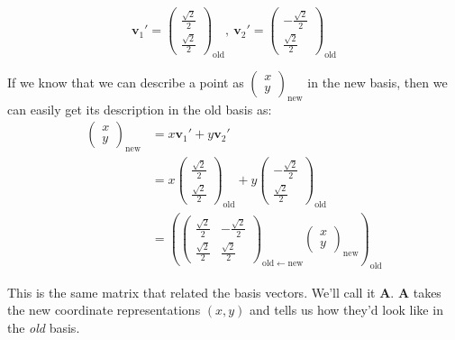 \documentclass[../master.tex]{subfiles}
\begin{document}
	\begin{equation*}
		\mathbf v_1' = \begin{pmatrix}
			\frac{\sqrt 2}{2} \\ \frac{\sqrt 2}{2}
		\end{pmatrix}_{\mathrm{old}}, ~
		\mathbf v_2' = \begin{pmatrix}
			-\frac{\sqrt 2}{2} \\ \frac{\sqrt 2}{2}
		\end{pmatrix}_{\mathrm{old}}
	\end{equation*}
		
	If we know that we can describe a point as $\begin{pmatrix}
					x \\ y
		\end{pmatrix}_{\text{new}}$
	in the new basis, then we can easily get its description in the old basis as:
	\begin{equation}\label{eq:ContravariantTransform}
		\begin{aligned}
			\begin{pmatrix}
						x \\ y
			\end{pmatrix}_{\mathrm{new}} 
			&= x \mathbf v_1' + y \mathbf v_2' \\
			&= x \begin{pmatrix}
				\frac{\sqrt 2}{2} \\ \frac{\sqrt 2}{2}
			\end{pmatrix}_{\mathrm{old}} 
			+ y \begin{pmatrix}
				-\frac{\sqrt 2}{2} \\ \frac{\sqrt 2}{2}
			\end{pmatrix}_{\mathrm{old}}
			\\ &=\left( \begin{pmatrix}
				 \frac{\sqrt 2}{2} &  -\frac{\sqrt 2}{2} \\
				 \frac{\sqrt 2}{2} &  \frac{\sqrt 2}{2}
			\end{pmatrix}_{\mathrm{old} \leftarrow \mathrm{new}}
			\begin{pmatrix}
						x \\ y
			\end{pmatrix}_{\mathrm{new}} \right)_{\mathrm{old}} 
		\end{aligned}
	\end{equation}
	
	This is the same matrix that related the basis vectors. We'll call it $\mathbf A$. $\mathbf A$ takes the new coordinate representations $(x,y)$ and tells us how they'd look like in the \emph{old} basis. 
\end{document}
